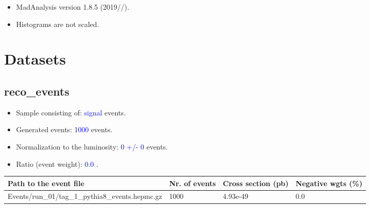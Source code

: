 \documentclass[a4paper, 10pt]{article}
\begin{document}
\begin{itemize}
  \item MadAnalysis version 1.8.5 (2019//).
   \item Histograms are not scaled.
 
\end{itemize}
\newpage
\section{ Datasets}

\subsection{ reco\_events}

\begin{itemize}
  \item Sample consisting of: \textcolor{blue}{signal}  events.
   \item Generated events: \textcolor{blue}{1000 }  events.
   \item Normalization to the luminosity: \textcolor{blue}{0}\textcolor{blue}{ +/\-- }\textcolor{blue}{0 }  events.
   \item Ratio (event weight): \textcolor{blue}{0.0 } .  
 
\end{itemize}
\begin{table}[H]
  \begin{center}
    \begin{tabular}{|m{55.0mm}|m{25.0mm}|m{30.0mm}|m{30.0mm}|}
      \hline
      {\cellcolor{yellow}         Path to the event file}& {\cellcolor{yellow}         Nr. of events}& {\cellcolor{yellow}         Cross section (pb)}& {\cellcolor{yellow}         Negative wgts (\%)}\\
      \hline
      {\cellcolor{white}          Events/\-run\_01/\-tag\_1\_pythia8\_events.hepmc.gz}& {\cellcolor{white}          1000}& {\cellcolor{white}          4.93e-49}& {\cellcolor{white}          0.0}\\
\hline
    \end{tabular}
  \end{center}
\end{table}
\end{document}
